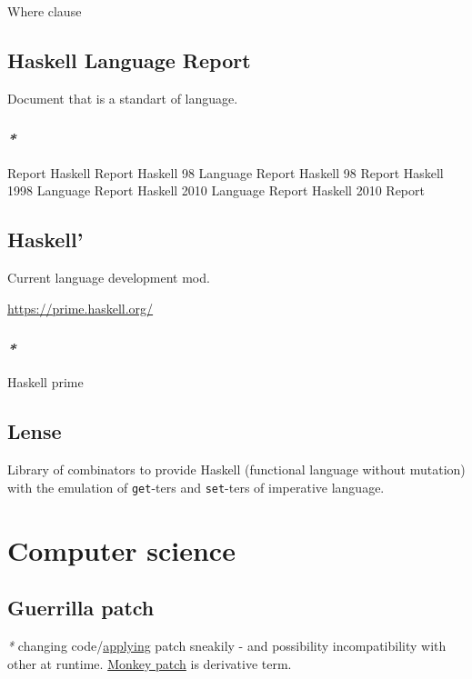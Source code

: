 \documentclass[a4paper,14pt,oneside]{book}
\begin{document}
\label{orgc549d63}Where clause

\section{\label{org5583842}Haskell Language Report}
\label{sec:org5b1d541}
Document that is a standart of language.

\subsection{\emph{*}}
\label{sec:org5f9f96c}
\label{org7224d0c}Report
\label{orgceb07aa}Haskell Report
\label{orgef4ec1d}Haskell 98 Language Report
\label{org4383fb3}Haskell 98 Report
\label{orgdac1713}Haskell 1998 Language Report
\label{org81e0982}Haskell 2010 Language Report
\label{org35621ec}Haskell 2010 Report

\section{\label{org124bd51}Haskell'}
\label{sec:orge0c308f}
Current language development mod.

\url{https://prime.haskell.org/}

\subsection{\emph{*}}
\label{sec:orgb28bf69}

\label{org843a330}Haskell prime

\section{\label{org4a5e6d6}Lense}
\label{sec:org0aba9c4}
Library of combinators to provide Haskell (functional language without mutation) with the emulation of \texttt{get}-ters and \texttt{set}-ters of imperative language.

\chapter{Computer science}
\label{sec:org87b2dab}
\section{\label{orgef01109}Guerrilla patch}
\label{sec:org5525cae}
\emph{*} changing code/\hyperref[orgfc57399]{applying} patch sneakily - and possibility incompatibility with other at runtime.
\hyperref[orgc9f6d81]{Monkey patch} is derivative term.
\end{document}
